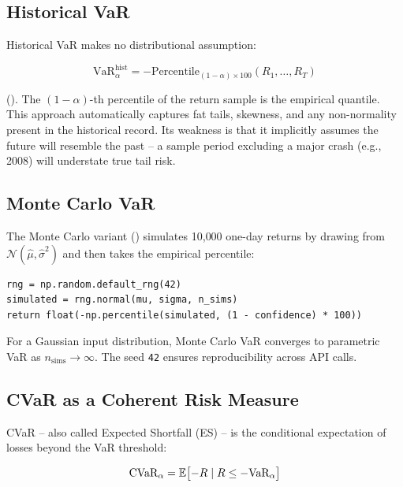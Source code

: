\subsection{Historical VaR}

Historical VaR makes no distributional assumption:

\begin{equation}
  \text{VaR}_\alpha^{\text{hist}} = -\text{Percentile}_{(1-\alpha) \times 100}(R_1, \ldots, R_T)
  \label{eq:var-hist}
\end{equation}

(). The $(1-\alpha)$-th percentile of the return sample is the empirical quantile. This approach automatically captures fat tails, skewness, and any non-normality present in the historical record. Its weakness is that it implicitly assumes the future will resemble the past -- a sample period excluding a major crash (e.g., 2008) will understate true tail risk.

\subsection{Monte Carlo VaR}

The Monte Carlo variant () simulates 10{,}000 one-day returns by drawing from $\mathcal{N}(\hat{\mu}, \hat{\sigma}^2)$ and then takes the empirical percentile:

\begin{lstlisting}[style=python, caption={Monte Carlo VaR -- \filepath{portfolio\_engine.py} lines 237--242}]
rng = np.random.default_rng(42)
simulated = rng.normal(mu, sigma, n_sims)
return float(-np.percentile(simulated, (1 - confidence) * 100))
\end{lstlisting}

For a Gaussian input distribution, Monte Carlo VaR converges to parametric VaR as $n_{\text{sims}} \to \infty$. The seed \texttt{42} ensures reproducibility across API calls.

\subsection{CVaR as a Coherent Risk Measure}

CVaR -- also called Expected Shortfall (ES) -- is the conditional expectation of losses beyond the VaR threshold:

\begin{equation}
  \text{CVaR}_\alpha = \operatorname{\mathbb{E}}\bigl[{-R} \mid R \leq -\text{VaR}_\alpha\bigr]
  \label{eq:cvar}
\end{equation}

